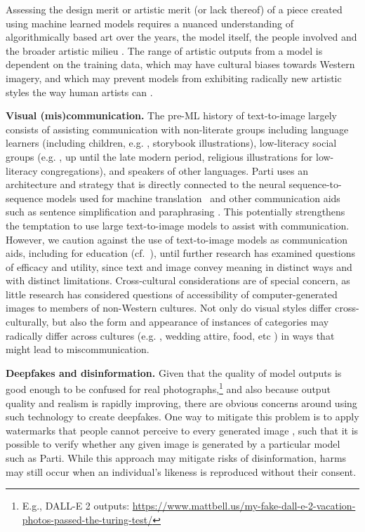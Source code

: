 Assessing the design merit or artistic merit (or lack thereof) of a piece created using machine learned models requires a nuanced understanding of algorithmically based art over the years, the model itself, the people involved and the broader artistic milieu \cite{browne_ai_artist}. The range of artistic outputs from a model is dependent on the training data, which may have cultural biases towards Western imagery, and which may prevent models from exhibiting radically new artistic styles the way human artists can \cite{gen-art-bias}.

\textbf{Visual (mis)communication.} The pre-ML history of text-to-image largely consists of assisting communication with non-literate groups including language learners (including children, e.g. , storybook illustrations), low-literacy social groups (e.g. , up until the late modern period, religious illustrations for low-literacy congregations), and speakers of other languages. Parti uses an architecture and strategy that is directly connected to the neural sequence-to-sequence models used for machine translation~\cite{wu2016google} and other communication aids such as sentence simplification \cite{alva-manchego-etal-2020-data} and paraphrasing \cite{zhou-bhat-2021-paraphrase}. This potentially strengthens the temptation to use large text-to-image models to assist with communication. However, we caution against the use of text-to-image models as communication aids, including for education (cf.~\cite{el2019tell}), until further research has examined questions of efficacy and utility, since text and image convey meaning in distinct ways and with distinct limitations. Cross-cultural considerations are of special concern, as little research has considered questions of accessibility of computer-generated images to members of non-Western cultures. Not only do visual styles differ cross-culturally, but also the form and appearance of instances of categories may radically differ across cultures (e.g. , wedding attire, food, etc \cite{shankar2017no, de2019does}) in ways that might lead to miscommunication.

\textbf{Deepfakes and disinformation.} Given that the quality of model outputs is good enough to be confused for real photographs,\footnote{E.g., DALL-E 2 outputs: {\scriptsize \url{https://www.mattbell.us/my-fake-dall-e-2-vacation-photos-passed-the-turing-test/}}} and also because output quality and realism is rapidly improving, there are obvious concerns around using such technology to create deepfakes. One way to mitigate this problem is to apply watermarks that people cannot perceive to every generated image \cite{luo2020distortion}, such that it is possible to verify whether any given image is generated by a particular model such as Parti. While this approach may mitigate risks of disinformation, harms may still occur when an individual's likeness is reproduced without their consent.


